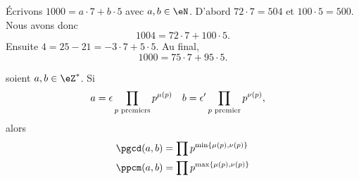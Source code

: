 %

\begin{example}
    Écrivons \( 1000=a\cdot 7+b\cdot 5\) avec \( a,b\in \eN\). D'abord \( 72\cdot 7=504\) et \( 100\cdot 5=500\). Nous avons donc 
    \begin{equation}
        1004=72\cdot 7+100\cdot 5.
    \end{equation}
    Ensuite \( 4=25-21=-3\cdot 7+5\cdot 5\). Au final,
    \begin{equation}
        1000=75\cdot 7+95\cdot 5.
    \end{equation}
\end{example}

\begin{proposition}
    soient \( a,b\in\eZ^*\). Si
    \begin{equation}
        \begin{aligned}[]
            a&=\epsilon\prod_{\text{\( p\) premiers}}p^{\mu(p)}&b&=\epsilon'\prod_{\text{\( p\) premier}}p^{\nu(p)},
        \end{aligned}
    \end{equation}
    alors
    \begin{subequations}
        \begin{align}
            \pgcd(a,b)&=\prod p^{\min\{ \mu(p),\nu(p) \}}\\
            \ppcm(a,b)&=\prod p^{\max\{ \mu(p),\nu(p) \}}
        \end{align}
    \end{subequations}    
\end{proposition}

